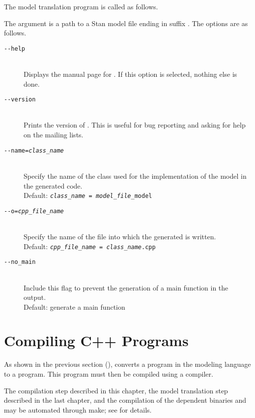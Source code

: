 The model translation program  is called as follows.
%
\begin{quote}
\end{quote}
%
The argument  is a path to a Stan model file ending
in suffix .  The options are as follows.
%
\begin{description}
%
\item[\tt {-}-help] 
\mbox{ } \\ 
Displays the manual page for \stanc.  If this option is selected,
nothing else is done.
%
\item[\tt {-}-version]
\mbox{ } \\ 
Prints the version of \stanc.  This is useful for bug reporting
and asking for help on the mailing lists.
%
\item[\tt {-}-name={\slshape class\_name}]
\mbox{ } \\ 
Specify the name of the class used for the implementation of the
\Stan model in the generated \Cpp code.  
\\[2pt]
Default: {\tt {\slshape class\_name = model\_file}\_model}
%
\item[\tt {-}-o={\slshape cpp\_file\_name}]
\mbox{ } \\ 
Specify the name of the file into which the generated \Cpp is written.
\\[2pt]
Default: {\tt {\slshape cpp\_file\_name} = {\slshape class\_name}.cpp}
%
\item[\tt {-}-no\_main]
\mbox{ } \\
Include this flag to prevent the generation of a main function in the
output.
\\[2pt]
Default: generate a main function
\end{description}



\section{Compiling C++ Programs}\label{compiling-cpp.section}

\noindent
As shown in the previous section (), \Stan converts
a program in the \Stan modeling language to a \Cpp program.  This \Cpp
program must then be compiled using a \Cpp compiler.  

The \Cpp compilation step described in this chapter, the model
translation step described in the last chapter, and the compilation of
the dependent binaries  and  may
be automated through make; see  for details.

